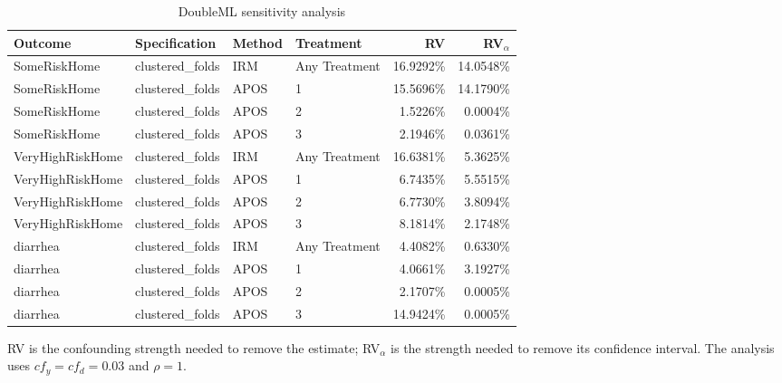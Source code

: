 \begin{table}[htbp]
\centering
\caption{DoubleML sensitivity analysis}
\label{tab:sensitivity-summary}
\begin{tabular}{llllrr}
\toprule
Outcome & Specification & Method & Treatment & RV & RV$_\alpha$ \\
\midrule
SomeRiskHome & clustered\_folds & IRM & Any Treatment & 16.9292\% & 14.0548\% \\
SomeRiskHome & clustered\_folds & APOS & 1 & 15.5696\% & 14.1790\% \\
SomeRiskHome & clustered\_folds & APOS & 2 & 1.5226\% & 0.0004\% \\
SomeRiskHome & clustered\_folds & APOS & 3 & 2.1946\% & 0.0361\% \\
VeryHighRiskHome & clustered\_folds & IRM & Any Treatment & 16.6381\% & 5.3625\% \\
VeryHighRiskHome & clustered\_folds & APOS & 1 & 6.7435\% & 5.5515\% \\
VeryHighRiskHome & clustered\_folds & APOS & 2 & 6.7730\% & 3.8094\% \\
VeryHighRiskHome & clustered\_folds & APOS & 3 & 8.1814\% & 2.1748\% \\
diarrhea & clustered\_folds & IRM & Any Treatment & 4.4082\% & 0.6330\% \\
diarrhea & clustered\_folds & APOS & 1 & 4.0661\% & 3.1927\% \\
diarrhea & clustered\_folds & APOS & 2 & 2.1707\% & 0.0005\% \\
diarrhea & clustered\_folds & APOS & 3 & 14.9424\% & 0.0005\% \\
\bottomrule
\end{tabular}
\par\vspace{3pt}
\begin{minipage}{0.9\linewidth}\footnotesize RV is the confounding strength needed to remove the estimate; RV$_\alpha$ is the strength needed to remove its confidence interval. The analysis uses $cf_y = cf_d = 0.03$ and $\rho = 1$.\end{minipage}
\end{table}